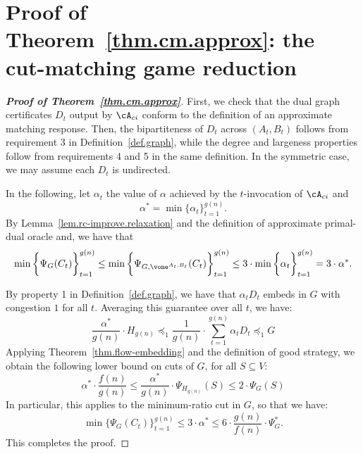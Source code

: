 \documentclass[letterpaper]{article}
\begin{document}
 \section{Proof of Theorem~\ref{thm.cm.approx}: the cut-matching game reduction}
\label{sec.cut-strategy.reduction-proof}

\cmapprox*
\begin{proof}[{\bf Proof of Theorem~\ref{thm.cm.approx}}]
First, we check that the dual graph certificates $D_t$ output by $\cA_{ci}$ conform to the definition of an approximate matching response.  Then, the bipartiteness of $D_t$ across $(A_t, B_t)$ follows from requirement 3 in Definition~\ref{def.graph}, while the degree and largeness properties follow from requirements 4 and 5 in the same definition. In the symmetric case, we may assume each $D_t$ is undirected.

In the following, let $\alpha_t$ the value of $\alpha$ achieved by the $t$-invocation of $\cA_{ci}$ and
$$
\alpha^* = \min\{\alpha_t\}_{t=1}^{g(n)}.
$$
By  Lemma~\ref{lem.rc-improve.relaxation} and the definition of approximate primal-dual oracle and, we have that
$$
\min \bigg\{\Psi_G(C_t)\bigg\}_{t=1}^{g(n)} \leq \min \bigg\{\Psi_{G,\vone^{A_t, B_t}}(C_t)\bigg\}_{t=1}^{g(n)}  \leq
3 \cdot \min \bigg\{\alpha_t \bigg\}_{t=1}^{g(n)}= 3 \cdot \alpha^*.
$$

By property 1 in Definition~\ref{def.graph}, we have that $\alpha_t D_t$ embeds in $G$ with congestion $1$ for all $t.$
Averaging this guarantee over all $t$, we have:
$$
\frac{\alpha^*}{g(n)}\cdot H_{g(n)} \preceq_1 \frac{1}{g(n)} \cdot \sum_{t=1}^{g(n)} \alpha_t D_t \preceq_1 G
$$
Applying Theorem~\ref{thm.flow-embedding} and the definition of good strategy, we obtain the following lower bound on cuts of $G$, for all $S \subseteq V:$
$$\alpha^* \cdot \frac{f(n)}{g(n)} \leq
\frac{\alpha^*}{g(n)}\cdot \Psi_{H_{g(n)}}(S) \leq 2 \cdot \Psi_G(S)
$$
In particular, this applies to the minimum-ratio cut in $G$, so that we have:
$$
\min \bigg\{\Psi_G(C_t)\bigg\}_{t=1}^{g(n)} \leq 3 \cdot \alpha^* \leq 6 \cdot \frac{g(n)}{f(n)} \cdot \Psi_G^*.
$$
This completes the proof.
\end{proof}
 
\end{document}
